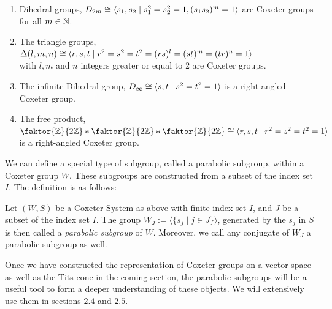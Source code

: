 \begin{example}
    \begin{enumerate}\label{ex:freeprod}
        \item Dihedral groups, \(D_{2m} \cong \langle s_1, s_2\;\vert\;s_1^2 = s_2^2 = 1, (s_1s_2)^m = 1\rangle\) are Coxeter groups for all \(m\in\mathbb{N}\).
        \item The triangle groups, \(\Delta(l,m,n) \cong \langle r,s,t\;\vert\;r^2 = s^2 = t^2 = (rs)^l = (st)^m = (tr)^n = 1\rangle\) \\
              with \(l, m\) and \(n\) integers greater or equal to \(2\) are Coxeter groups.
        \item The infinite Dihedral group, \(D_\infty \cong \langle s,t\;\vert\;s^2=t^2=1\rangle\) is a right-angled Coxeter group.
        \item The free product, \(\faktor{\Z}{2\Z}\ast\faktor{\Z}{2\Z}\ast\faktor{\Z}{2\Z} \cong \groupp{r,s,t}{r^2=s^2=t^2=1}\) is a right-angled Coxeter group.
    \end{enumerate}
\end{example}


We can define a special type of subgroup, called a parabolic subgroup, within a Coxeter group \(W\).
These subgroups are constructed from a subset of the index set \(I\).
The definition is as follows:

\begin{definition}
    Let \((W,S)\) be a Coxeter System as above with finite index set \(I\), and \(J\) be a subset of the index set \(I\).
    The group \(W_J := \langle\{s_j \;\vert\; j\in J\}\rangle\), generated by the \(s_j\) in \(S\) is then called a \emph{parabolic subgroup} of \(W\).
    Moreover, we call any conjugate of \(W_J\) a parabolic subgroup as well.
\end{definition}

Once we have constructed the representation of Coxeter groups on a vector space as well as the Tits cone in the coming section, the parabolic subgroups will be a useful tool to form a deeper understanding of these objects.
We will extensively use them in sections \(2.4\) and \(2.5\).

